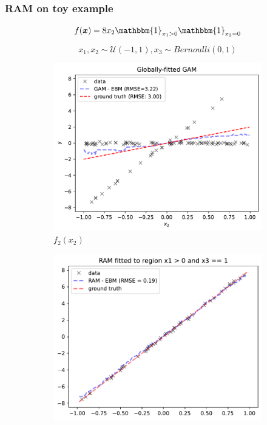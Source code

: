 \documentclass{beamer}
\newcommand{\xb}{\boldsymbol{x}}
\newcommand{\when}[1]{\mathbbm{1}_{#1}}
\begin{document}
\begin{frame}
  \frametitle{RAM on toy example}

  \[f(\xb) = 8x_2\when{x_1 > 0}\when{x_3=0}\]

  \[ x_1, x_2 \sim \mathcal{U}(-1,1), x_3 \sim Bernoulli(0,1)\]

  \noindent\makebox[\linewidth]{\rule{\paperwidth}{0.4pt}}

  \begin{figure}[htbp]
    \centering
    \begin{subfigure}{0.32\textwidth}
        \centering
        \includegraphics[width=\textwidth]{figures/global_GAM}
        \caption{\(f_2(x_2)\)}
        \label{subfig:global_gam}
    \end{subfigure}
    \begin{subfigure}{0.32\textwidth}
        \centering
        \includegraphics[width=\textwidth]{figures/regional_gam_subreg_1}

\end{subfigure}
\end{figure}
\end{frame}
\end{document}
